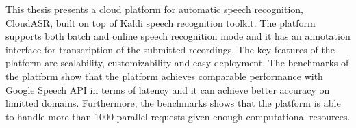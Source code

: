 This thesis presents a cloud platform for automatic speech recognition, CloudASR,
  built on top of Kaldi speech recognition toolkit.
The platform supports both batch and online speech recognition mode
  and it has an annotation interface for transcription of the submitted recordings.
The key features of the platform are scalability, customizability and easy deployment.
The benchmarks of the platform show
  that the platform achieves comparable performance with Google Speech API in terms of latency
  and it can achieve better accuracy on limitted domains.
Furthermore, the benchmarks shows that the platform is able to handle more than 1000 parallel requests given enough computational resources.
\bye
